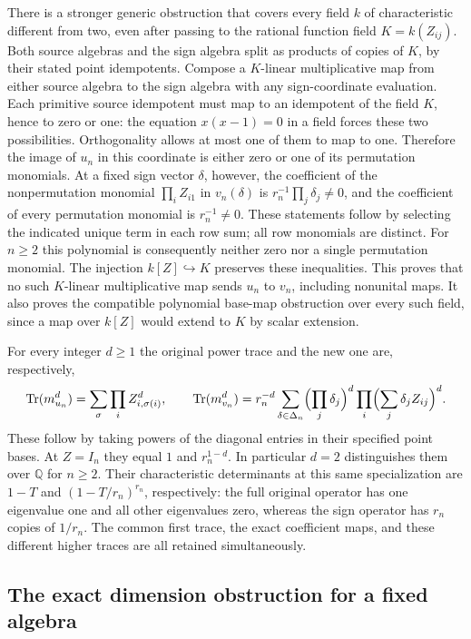 There is a stronger generic obstruction that covers every field $k$
of characteristic different from two, even after passing to the
rational function field $K=k(Z_{ij})$. Both source algebras and the
sign algebra split as products of copies of $K$, by their stated
point idempotents. Compose a $K$-linear multiplicative map from
either source algebra to the sign algebra with any sign-coordinate
evaluation. Each primitive source idempotent must map to an
idempotent of the field $K$, hence to zero or one: the equation
$x(x-1)=0$ in a field forces these two possibilities. Orthogonality
allows at most one of them to map to one. Therefore the image
of $u_n$ in this coordinate is either zero or one of its permutation
monomials. At a fixed sign vector $\delta$, however, the coefficient
of the nonpermutation monomial $\prod_i Z_{i1}$ in $v_n(\delta)$
is $r_n^{-1}\prod_j\delta_j\ne0$, and the coefficient of every
permutation monomial is $r_n^{-1}\ne0$. These statements follow
by selecting the indicated unique term in each row sum; all row
monomials are distinct. For $n\ge2$ this polynomial is consequently
neither zero nor a single permutation monomial. The injection
$k[Z]\hookrightarrow K$ preserves these inequalities. This proves
that no such $K$-linear multiplicative map sends $u_n$ to $v_n$,
including nonunital maps. It also proves the compatible polynomial
base-map obstruction over every such field, since a map over
$k[Z]$ would extend to $K$ by scalar extension.

For every integer $d\ge1$ the original power trace and the new one
are, respectively,
\[
 \operatorname{Tr}(m_{u_n}^d)=
       \sum_{\sigma}\prod_i Z_{i,\sigma(i)}^d,
 \qquad
 \operatorname{Tr}(m_{v_n}^d)=
       r_n^{-d}\sum_{\delta\in\Delta_n}
       \Bigl(\prod_j\delta_j\Bigr)^d
       \prod_i\Bigl(\sum_j\delta_j Z_{ij}\Bigr)^d.
\]
These follow by taking powers of the diagonal entries in their
specified point bases. At $Z=I_n$ they equal $1$ and $r_n^{1-d}$.
In particular $d=2$ distinguishes them over $\mathbb Q$ for $n\ge2$.
Their characteristic determinants at this same specialization are
$1-T$ and $(1-T/r_n)^{r_n}$, respectively: the full original
operator has one eigenvalue one and all other eigenvalues zero,
whereas the sign operator has $r_n$ copies of $1/r_n$.
The common first trace, the exact coefficient maps, and these
different higher traces are all retained simultaneously.

\subsection{The exact dimension obstruction for a fixed algebra}

